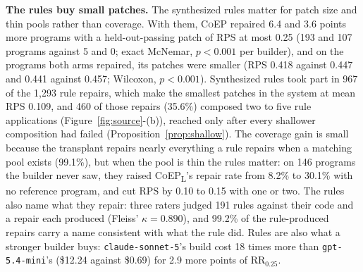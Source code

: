\documentclass[acmsmall,screen,review,anonymous,nonacm]{acmart}
\newcommand{\tool}{\textsc{CoEP}\xspace}
\newcommand{\coepL}{\textsc{CoEP}\textsubscript{L}\xspace}
\newcommand{\cs}{\texttt{claude-sonnet-5}\xspace}
\newcommand{\gm}{\texttt{gpt-5.4-mini}\xspace}
\begin{document}
\textbf{The rules buy small patches.} The synthesized rules matter for patch size and thin pools rather than coverage. With them, \tool repaired 6.4 and 3.6 points more programs with a held-out-passing patch of RPS at most 0.25 (193 and 107 programs against 5 and 0; exact McNemar, $p < 0.001$ per builder), and on the programs both arms repaired, its patches were smaller (RPS 0.418 against 0.447 and 0.441 against 0.457; Wilcoxon, $p < 0.001$). Synthesized rules took part in 967 of the 1{,}293 rule repairs, which make the smallest patches in the system at mean RPS 0.109, and 460 of those repairs (35.6\%) composed two to five rule applications (Figure~\ref{fig:source}-(b)), reached only after every shallower composition had failed (Proposition~\ref{prop:shallow}). The coverage gain is small because the transplant repairs nearly everything a rule repairs when a matching pool exists (99.1\%), but when the pool is thin the rules matter: on 146 programs the builder never saw, they raised \coepL's repair rate from 8.2\% to 30.1\% with no reference program, and cut RPS by 0.10 to 0.15 with one or two. The rules also name what they repair: three raters judged 191 rules against their code and a repair each produced (Fleiss' $\kappa = 0.890$), and 99.2\% of the rule-produced repairs carry a name consistent with what the rule did. Rules are also what a stronger builder buys: \cs's build cost 18 times more than \gm's (\$12.24 against \$0.69) for 2.9 more points of $\mathrm{RR}_{0.25}$.
\end{document}
